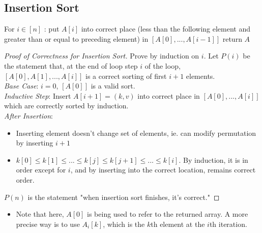 \documentclass[11pt]{scrartcl}
\theoremstyle{dotlessP}
\theoremstyle{dotlessN}
\begin{document}
\subsection{Insertion Sort}
For $i \in [n]$ :
	put $A[i]$ into correct place (less than the following element and greater than or equal to preceding element) in $[A[0],...,A[i-1]]$
return $A$
\begin{proof}
	[Proof of Correctness for Insertion Sort]
	Prove by induction on $i$. Let $P(i)$ be the statement that, at the end of loop step $i$ of the loop, $[A[0],A[1],...,A[i]]$ is a correct sorting of first  $i+1$ elements.
	\\

	\textit{Base Case}: $i=0$,  $[A[0]]$ is a valid sort.
	\\

	\textit{Inductive Step}: Insert $A[i+1] = (k,v)$ into correct place in $[A[0],...,A[i]]$ which are correctly sorted by induction. 
	\\

	\textit{After Insertion}: 
	\begin{itemize}
		\item Inserting element doesn't change set of elements, ie. can modify permutation by inserting $i+1$
		\item $k[0] \leq k[1] \leq ... \leq k[j] \leq k[j+1] \leq ... \leq k[i]$. By induction, it is in order except for $i$, and by inserting into the correct location, remains correct order.
	\end{itemize}
	$P(n)$ is the statement "when insertion sort finishes, it's correct."
\end{proof}
\begin{itemize}
	\item	Note that here, $A[0]$ is being used to refer to the returned array. A more precise way is to use $A_i[k]$, which is the $k$th element at the $i$th iteration.
\end{itemize}
\end{document}
